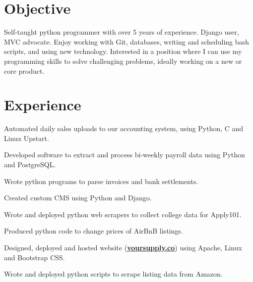 \documentclass[]{deemweaver}
\begin{document}
\begin{minipage}[t]{0.66\textwidth} 

\section{Objective}
Self-taught python programmer with over 5 years of experience. Django user, MVC advocate. Enjoy working with Git, databases, writing and scheduling bash scripts, and using new technology. Interested in a position where I can use my programming skills to solve challenging problems, ideally working on a new or core product.

\section{Experience}
\begin{tightemize}
\vspace{\topsep} %
\item Automated daily sales uploads to our accounting system, using Python, C and Linux Upstart.
\item Developed software to extract and process bi-weekly payroll data using Python and PostgreSQL. 
\item Wrote python programs to parse invoices and bank settlements.
\end{tightemize}
\sectionsep

\begin{tightemize}
\item Created custom CMS using Python and Django.
\item Wrote and deployed python web scrapers to collect college data for Apply101.
\item Produced python code to change prices of AirBnB listings.
\end{tightemize}
\sectionsep

\begin{tightemize}
\item Designed, deployed and hosted website (\href{http://yoursupply.co}{\bf yoursupply.co}) using Apache, Linux and Bootstrap CSS.
\item Wrote and deployed python scripts to scrape listing data from Amazon.
\end{tightemize}
\sectionsep



\end{minipage}
\end{document}
